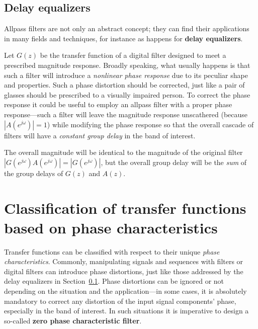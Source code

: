 \documentclass[\documentfontsize, twocolumn]{\classname}
\begin{document}
\subsection{Delay equalizers}\label{sec:delayEqualizers}

Allpass filters are not only an abstract concept; they can find their applications in many fields and techniques, for instance as happens for \textbf{delay equalizers}.

Let $G(z)$ be the transfer function of a digital filter designed to meet a prescribed magnitude response. Broadly speaking, what usually happens is that such a filter will introduce a \emph{nonlinear phase response} due to its peculiar shape and properties. Such a phase distortion should be corrected, just like a pair of glasses should be prescribed to a visually impaired person. To correct the phase response it could be useful to employ an allpass filter with a proper phase response---such a filter will leave the magnitude response unscathered (because $|A(e^{j\omega})| = 1$) while modifying the phase response so that the overall cascade of filters will have a \emph{constant group delay} in the band of interest.

\begin{center}
\end{center}

The overall magnitude will be identical to the magnitude of the original filter $|G(e^{j\omega})A(e^{j\omega})| = |G(e^{j\omega})|$, but the overall group delay will be the \emph{sum} of the group delays of $G(z)$ and $A(z)$.

\section{Classification of transfer functions based on phase characteristics}

Transfer functions can be classified with respect to their unique \emph{phase characteristics}. Commonly, manipulating signals and sequences with filters or digital filters can introduce phase distortions, just like those addressed by the delay equalizers in Section~\ref{sec:delayEqualizers}. Phase distortions can be ignored or not depending on the situation and the application---in some cases, it is absolutely mandatory to correct any distortion of the input signal components' phase, especially in the band of interest. In such situations it is imperative to design a so-called \textbf{zero phase characteristic filter}.
\end{document}
